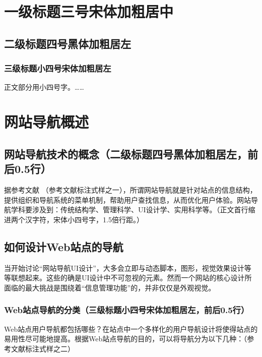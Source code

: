 
\section{一级标题三号宋体加粗居中}   
\subsection{二级标题四号黑体加粗居左}
\subsubsection{三级标题小四号宋体加粗居左}
\par  正文部分用小四号字。……

\newpage
\section{网站导航概述}
\subsection{网站导航技术的概念（二级标题四号黑体加粗居左，前后0.5行）}
\par 据参考文献 \citep{Naidu1989Evaluation}（参考文献标注式样之一），所谓网站导航就是针对站点的信息结构，提供组织和导航系统的菜单机制，帮助用户查找信息，从而优化用户体验。网站导航学科要涉及到：传统结构学、管理科学、UI设计学、实用科学等。（正文首行缩进两个汉字符，宋体小四号字，1.5倍行距。）

\subsection{如何设计Web站点的导航}
\par 当开始讨论“网站导航UI设计”，大多会立即与动态脚本，图形，视觉效果设计等等联想起来。这些的确是UI设计中不可忽视的元素。然而一个网站的核心设计所面临的最大挑战是围绕着“信息管理功能”的，并非仅仅是外观视觉。\\

\subsubsection{Web站点导航的分类（三级标题小四号宋体加粗居左，前后0.5行）}
\par Web站点用户导航都包括哪些？在站点中一个多样化的用户导航设计将使得站点的易用性尽可能地提高。根据Web站点导航的目的，可以将导航分为以下几种：（参考文献标注式样之二）
